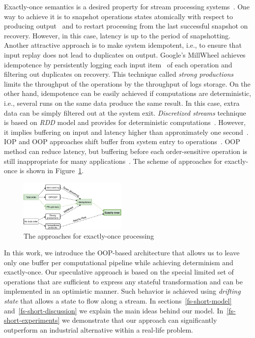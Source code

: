 \label {fs-short-intro}

Exactly-once semantics is a desired property for stream processing systems~\cite{Akidau:2013:MFS:2536222.2536229}. One way to achieve it is to snapshot operations states atomically with respect to producing output~\cite{Carbone:2017:SMA:3137765.3137777} and to restart processing from the last successful snapshot on recovery. However, in this case, latency is up to the period of snapshotting. Another attractive approach is to make system idempotent, i.e., to ensure that input replay does not lead to duplicates on output. Google's MillWheel achieves idempotence by persistently logging each input item~\cite{Akidau:2013:MFS:2536222.2536229} of each operation and filtering out duplicates on recovery. This technique called {\em strong productions} limits the throughput of the operations by the throughput of logs storage. On the other hand, idempotence can be easily achieved if computations are deterministic, i.e., several runs on the same data produce the same result. In this case, extra data can be simply filtered out at the system exit. {\em Discretized streams} technique is based on {\em RDD} model and provides for deterministic computations~\cite{Zaharia:2012:DSE:2342763.2342773}. However, it implies buffering on input and latency higher than approximately one second~\cite{Qian:2013:TRS:2465351.2465353}. IOP and OOP approaches shift buffer from system entry to operations~\cite{Li:2008:OPN:1453856.1453890}. OOP method can reduce latency, but buffering before each order-sensitive operation is still inappropriate for many applications~\cite{Zacheilas:2017:MDS:3093742.3093921}. The scheme of approaches for exactly-once is shown in Figure~\ref{approaches}.

\begin{figure}[ht]
  \centering
  \includegraphics[width=0.47\textwidth]{pics/intro-approaches}
  \caption{The approaches for exactly-once processing}
  \label {approaches}
\end{figure}

In this work, we introduce the OOP-based architecture that allows us to leave only one buffer per computational pipeline while achieving determinism and exactly-once. Our speculative approach is based on the special limited set of operations that are sufficient to express any stateful transformation and can be implemented in an optimistic manner. Such behavior is achieved using {\em drifting state} that allows a state to flow along a stream. In sections~\ref{fs-short-model} and~\ref{fs-short-discussion} we explain the main ideas behind our model. In~\ref{fs-short-experiments} we demonstrate that our approach can significantly outperform an industrial alternative within a real-life problem. 
